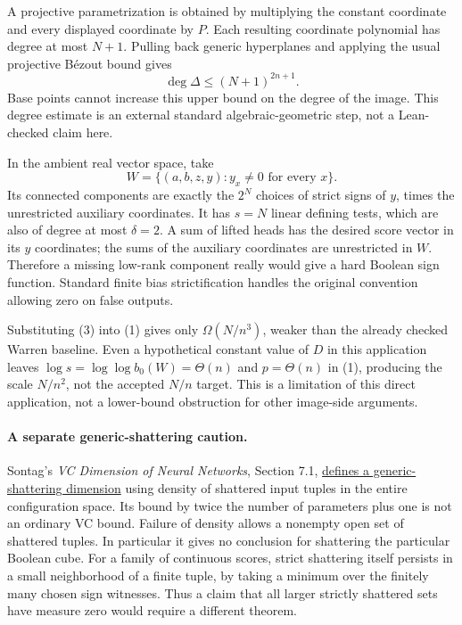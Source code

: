 \documentclass[11pt]{article}
\begin{document}
A projective parametrization is obtained by multiplying the constant
coordinate and every displayed coordinate by $P$. Each resulting
coordinate polynomial has degree at most $N+1$. Pulling back generic
hyperplanes and applying the usual projective B\'ezout bound gives
\[
 \deg\Delta\leq(N+1)^{2n+1}.
 \tag{3}
\]
Base points cannot increase this upper bound on the degree of the image.
This degree estimate is an external standard algebraic-geometric step,
not a Lean-checked claim here.

In the ambient real vector space, take
\[
 W=\{(a,b,z,y):y_x\neq0\text{ for every }x\}.
\]
Its connected components are exactly the $2^N$ choices of strict signs
of $y$, times the unrestricted auxiliary coordinates. It has $s=N$
linear defining tests, which are also of degree at most $\delta=2$.
A sum of lifted heads has the desired score vector in its $y$
coordinates; the sums of the auxiliary coordinates are unrestricted in
$W$. Therefore a missing low-rank component really would give a hard
Boolean sign function. Standard finite bias strictification handles the
original convention allowing zero on false outputs.

Substituting (3) into (1) gives only
$\Omega(N/n^3)$, weaker than the already checked Warren baseline.
Even a hypothetical constant value of $D$ in this application leaves
$\log s=\log\log b_0(W)=\Theta(n)$ and $p=\Theta(n)$ in (1), producing
the scale $N/n^2$, not the accepted $N/n$ target. This is a limitation
of this direct application, not a lower-bound obstruction for other
image-side arguments.

\paragraph{A separate generic-shattering caution.}
Sontag's \emph{VC Dimension of Neural Networks}, Section 7.1,
\href{https://mathsci.kaist.ac.kr/~nipl/mas557/VCD_ANN_3.pdf}{defines a
generic-shattering dimension} using density of shattered input tuples
in the entire configuration space. Its bound by twice the number of
parameters plus one is not an ordinary VC bound. Failure of density
allows a nonempty open set of shattered tuples. In particular it gives
no conclusion for shattering the particular Boolean cube. For a family
of continuous scores, strict shattering itself persists in a small
neighborhood of a finite tuple, by taking a minimum over the finitely
many chosen sign witnesses. Thus a claim that all larger strictly
shattered sets have measure zero would require a different theorem.
\end{document}
